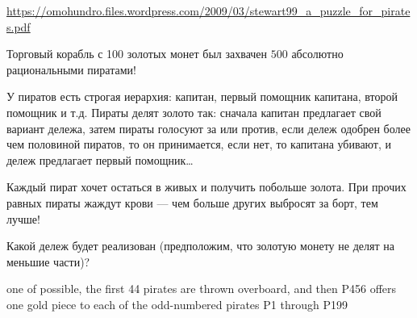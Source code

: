 \begin{problem} \par
\begin{source}
 \url{https://omohundro.files.wordpress.com/2009/03/stewart99_a_puzzle_for_pirates.pdf}
\end{source}
Торговый корабль с 100 золотых монет был захвачен $500$ абсолютно рациональными пиратами!  \par
У пиратов есть строгая иерархия: капитан, первый помощник капитана, второй помощник и т.д. Пираты делят золото так: сначала капитан предлагает свой вариант дележа, затем пираты голосуют за или против, если дележ одобрен более чем половиной пиратов, то он принимается, если нет, то капитана убивают, и дележ предлагает первый помощник\ldots \par
Каждый пират хочет остаться в живых и получить побольше золота. При прочих равных пираты жаждут крови --- чем больше других выбросят за борт, тем лучше! \par
Какой дележ будет реализован (предположим, что золотую монету не делят на меньшие части)?

\begin{sol}

 one of possible, the first 44 pirates are thrown overboard, and then P456 offers
 one gold piece to each of the odd-numbered pirates P1 through P199
\end{sol}
\end{problem}







